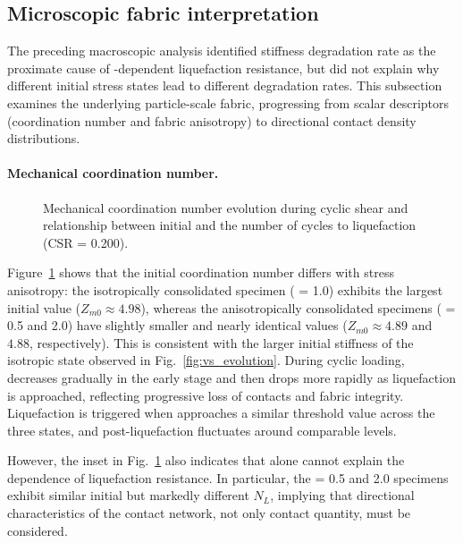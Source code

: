 \subsection{Microscopic fabric interpretation}
\label{subsec:micro_fabric_results}

The preceding macroscopic analysis identified stiffness degradation rate as the proximate cause of \Kzero{}-dependent liquefaction resistance, but did not explain why different initial stress states lead to different degradation rates. This subsection examines the underlying particle-scale fabric, progressing from scalar descriptors (coordination number and fabric anisotropy) to directional contact density distributions.

\paragraph{Mechanical coordination number.}

\begin{figure}[t]
  \centering
  \caption{Mechanical coordination number evolution during cyclic shear and relationship between initial \Zm{} and the number of cycles to liquefaction (CSR = 0.200).}
  \label{fig:zm_evolution}
\end{figure}

Figure~\ref{fig:zm_evolution} shows that the initial coordination number differs with stress anisotropy: the isotropically consolidated specimen (\Kzero{} = 1.0) exhibits the largest initial value ($Z_{m0} \approx 4.98$), whereas the anisotropically consolidated specimens (\Kzero{} = 0.5 and 2.0) have slightly smaller and nearly identical values ($Z_{m0} \approx 4.89$ and $4.88$, respectively). This is consistent with the larger initial stiffness of the isotropic state observed in Fig.~\ref{fig:vs_evolution}. During cyclic loading, \Zm{} decreases gradually in the early stage and then drops more rapidly as liquefaction is approached, reflecting progressive loss of contacts and fabric integrity. Liquefaction is triggered when \Zm{} approaches a similar threshold value across the three states, and post-liquefaction \Zm{} fluctuates around comparable levels.

However, the inset in Fig.~\ref{fig:zm_evolution} also indicates that \Zm{} alone cannot explain the \Kzero{} dependence of liquefaction resistance. In particular, the \Kzero{} = 0.5 and 2.0 specimens exhibit similar initial \Zm{} but markedly different $N_L$, implying that directional characteristics of the contact network, not only contact quantity, must be considered.

